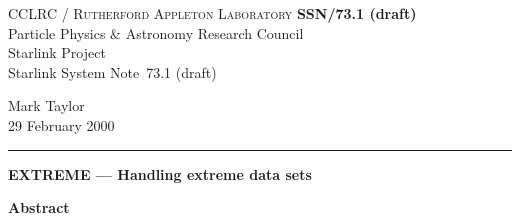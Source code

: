 \documentclass[twoside,11pt]{article}
\newcommand{\stardoccategory}  {Starlink System Note}
\newcommand{\stardocinitials}  {SSN}
\newcommand{\stardocnumber}    {73.1 (draft)}
\newcommand{\stardocauthors}   {Mark Taylor}
\newcommand{\stardocdate}      {29 February 2000}
\newcommand{\stardoctitle}     {EXTREME --- Handling extreme data sets}
\newcommand{\stardocname}{\stardocinitials /\stardocnumber}
\newenvironment{latexonly}{}{}
\renewcommand{\_}{\texttt{\symbol{95}}}
\begin{document}
\thispagestyle{empty}

\begin{latexonly}
   CCLRC / \textsc{Rutherford Appleton Laboratory} \hfill \textbf{\stardocname}\\
   {\large Particle Physics \& Astronomy Research Council}\\
   {\large Starlink Project\\}
   {\large \stardoccategory\ \stardocnumber}
   \begin{flushright}
   \stardocauthors\\
   \stardocdate
   \end{flushright}
   \vspace{-4mm}
   \rule{\textwidth}{0.5mm}
   \vspace{5mm}
   \begin{center}
   {\Large\textbf{\stardoctitle}}
   \end{center}
   \vspace{5mm}

   \vspace{10mm}
   \begin{center}
      {\Large\textbf{Abstract}}
   \end{center}
\end{latexonly}
\end{document}
